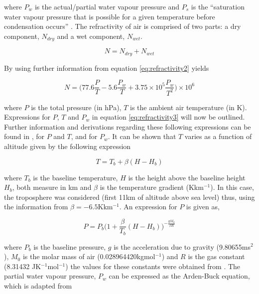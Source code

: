 \documentclass[11pt]{article}
\begin{document}
\vspace{2mm}
\noindent
where $P_w$ is the actual/partial water vapour pressure and $P_s$ is the ``saturation water vapour pressure that is possible for a given temperature before condensation occurs'' \cite{Book01}. The refractivity of air is comprised of two parts: a dry component, $N_{dry}$ and a wet component, $N_{wet}$.

\begin{equation}
N = N_{dry} + N_{wet}
\label{eq:refractivity2}
\end{equation}

\vspace{2mm}
\noindent
By using further information from \cite{Paper02} equation \eqref{eq:refractivity2} yields

\begin{equation}
N = \bigg(77.6\frac{P}{T} - 5.6\frac{P_w}{T} + 3.75 \times 10^5\frac{P_w}{T^2} \bigg) \times 10^6
\label{eq:refractivity3}
\end{equation}

\vspace{2mm}
\noindent
where $P$ is the total pressure (in hPa), $T$ is the ambient air temperature (in K). Expressions for $P$, $T$ and $P_w$ in equation \eqref{eq:refractivity3} will now be outlined. Further information and derivations regarding these following expressions can be found in \cite{Paper03}, for $P$ and $T$, and \cite{Paper04} for $P_w$. It can be shown that $T$ varies as a function of altitude given by the following expression

\begin{equation}
T = T_b + \beta(H - H_b)
\label{eq:temperature}
\end{equation}

\vspace{2mm}
\noindent
where $T_b$ is the baseline temperature, $H$ is the height above the baseline height $H_b$, both measure in km and $\beta$ is the temperature gradient (Kkm$^{-1}$). In this case, the troposphere was considered (first 11km of altitude above sea level) thus, using the information from \cite{Paper03} $\beta = - 6.5$Kkm$^{-1}$. An expression for $P$ is given as,

\begin{equation}
P = P_b \bigg( 1 + \frac{\beta}{T_b}(H - H_b) \bigg) ^{-\frac{gM_0}{\beta R}}
\label{eq:pressure}
\end{equation}

\vspace{2mm}
\noindent
where $P_b$ is the baseline pressure, $g$ is the acceleration due to gravity (9.80655ms$^2$), $M_0$ is the molar mass of air (0.028964420kgmol$^{-1}$) and $R$ is the gas constant (8.31432 JK$^{-1}$mol$^{-1}$) {\textemdash} the values for these constants were obtained from \cite{Paper03}. The partial water vapour pressure, $P_w$ can be expressed as the Arden-Buck equation, which is adapted from \cite{Paper04}
\end{document}
